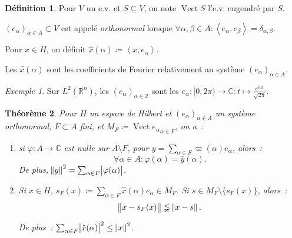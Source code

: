 \documentclass{report}
\DeclareMathOperator{\Vect}{Vect}
\newcommand{\C}{{\mathbb C}}
\newcommand{\R}{{\mathbb R}}
\newcommand{\Z}{{\mathbb Z}}
\newcommand{\scpr}[2]{\left\langle#1, #2\right\rangle}
\newtheorem{thm}{Théorème}[chapter]
\theoremstyle{definition}
\newtheorem{déf}[thm]{Définition}
\theoremstyle{remark}
\newtheorem{ex}{Exemple}[chapter]
\begin{document}
\begin{déf} Pour $V$ un e.v. et $S \subseteq V$, on note $\Vect S$ l'e.v. engendré par $S$.

$(e_\alpha)_{\alpha \in A} \subset V$ est appelé \textit{orthonormal} lorsque $\forall \alpha, \beta \in A : \scpr {e_\alpha}{e_\beta} = \delta_{\alpha,\beta}$.

Pour $x \in H$, on définit $\hat x(\alpha) \coloneqq \scpr x{e_\alpha}$.
\end{déf}

Les $\hat x(\alpha)$ sont les coefficients de Fourier relativement au système $(e_\alpha)_{\alpha \in A}$.

\begin{ex} Sur $L^2(\R^n)$, les $(e_\alpha)_{\alpha \in \Z}$ sont les $e_\alpha : [0, 2\pi) \to \C : t \mapsto \frac {e^{i\alpha t}}{\sqrt {2\pi}}$.
\end{ex}

\begin{thm} Pour $H$ un espace de Hilbert et $(e_\alpha)_{\alpha \in A}$ un système orthonormal, $F \subset A$ fini, et $M_F \coloneqq \Vect {e_\alpha}_{\alpha \in F}$, on a~:
\begin{enumerate}
	\item si $\varphi : A \to \C$ est nulle sur $A \setminus F$, pour $y = \sum_{\alpha \in F}\varpi(\alpha)e_\alpha$, alors~:
	\[\forall \alpha \in A : \varphi(\alpha) = \hat y(\alpha).\]
	De plus, $\norm y^2 = \sum_{\alpha \in F}\abs {\varphi(\alpha)}$.

	\item Si $x \in H$, $s_F(x) \coloneqq \sum_{\alpha \in F}\hat x(\alpha)e_\alpha \in M_F$. Si $s \in M_F \setminus \{s_F(x)\}$, alors~:
	\[\norm {x-s_F(x)} \lneqq \norm {x-s}.\]

	De plus~: $\sum_{\alpha \in F}\abs {\hat x(\alpha)}^2 \leq \norm x^2$.
\end{enumerate}
\end{thm}
\end{document}

